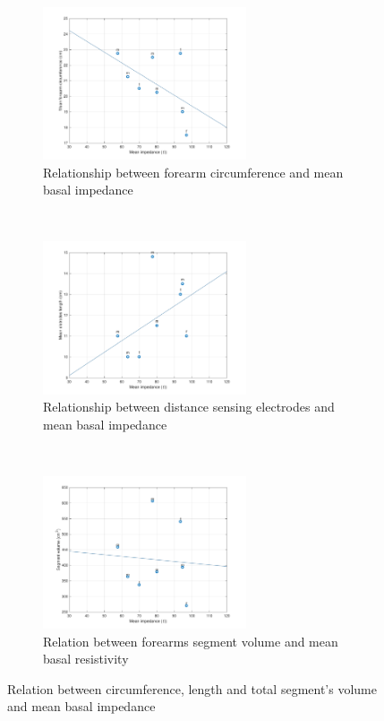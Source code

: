 \begin{figure}[t!]
	\centering
	\begin{subfigure}[t]{0.5\textwidth}
		\centering
		\includegraphics[height=4.5cm]{figure2a}
		\caption{Relationship between forearm circumference and mean basal impedance}
		\label{fig:C_vs_Z}
	\end{subfigure}%
	~ 
	\begin{subfigure}[t]{0.5\textwidth}
		\centering
		\includegraphics[height=4.5cm]{figure2b}
		\caption{Relationship between distance sensing electrodes and mean basal impedance}
		\label{fig:l_vs_Z}
	\end{subfigure}
	~ 
	\begin{subfigure}[t]{0.5\textwidth}
		\centering
		\includegraphics[height=4.5cm]{figure2c}
		\caption{Relation between forearms segment volume and mean basal resistivity}
		\label{fig:Ve_vs_Z}
	\end{subfigure}
	\caption{Relation between circumference, length and total segment's volume and mean basal impedance}
	\label{fig:relation_geometry_vs_impedance}
\end{figure}


